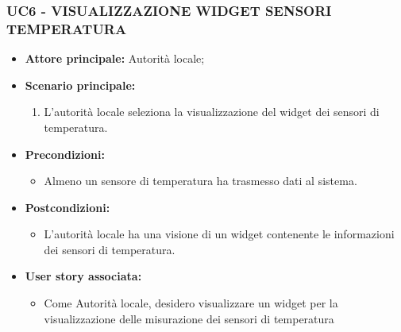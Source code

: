 \subsubsection{UC6 - VISUALIZZAZIONE WIDGET SENSORI TEMPERATURA}
\begin{itemize}
    \item \textbf{Attore principale:} Autorità locale;
    \item \textbf{Scenario principale:}
          \begin{enumerate}
              \item L'autorità locale seleziona la visualizzazione del widget dei sensori di temperatura.
          \end{enumerate}
    \item \textbf{Precondizioni:}
          \begin{itemize}
              \item  Almeno un sensore di temperatura ha trasmesso dati al sistema.
          \end{itemize}
    \item \textbf{Postcondizioni:}
          \begin{itemize}
              \item  L'autorità locale ha una visione di un widget contenente le informazioni dei sensori di temperatura.
          \end{itemize}
    \item \textbf{User story associata:}
          \begin{itemize}
              \item Come Autorità locale, desidero visualizzare un widget per la visualizzazione delle misurazione dei sensori di temperatura
          \end{itemize}
\end{itemize}